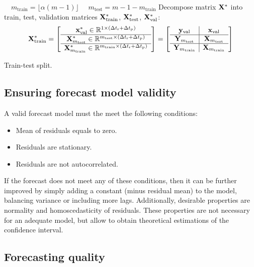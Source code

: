 \documentclass[12pt]{article}
\newcommand{\dtr}{\Delta t_\text{r}}
\newcommand{\dtp}{\Delta t_\text{p}}
\begin{document}
\begin{algorithm}[!h]
 $ \quad m_{\text{train}} = \lfloor\alpha(m-1)\rfloor$ \;
 $ \quad m_{\text{test}} = m - 1 - m_{\text{train}} $ \; %
 Decompose matrix ${\mathbf{X}}^{*}$ into train, test, validation matrices ${\mathbf{X}}^{*}_{\text{train}}$, ${\mathbf{X}}^{*}_{\text{test}}$, ${\mathbf{X}}^{*}_{\text{val}}$:
 \[\bX^{*}_{\text{train}} = \left[\begin{array}{c} \x^{*}_{\text{val}} \in \mathbb{R}^{1\times (\dtr + \dtp)}\\
 \hline
 \bX^{*}_{m_{\text{test}}} \in \mathbb{R}^{m_{\text{test}} \times (\dtr + \dtp)} \\
 \hline
 \bX^{*}_{m_{\text{train}}} \in \mathbb{R}^{m_{\text{train}} \times (\dtr + \dtp)} 
 \end{array}\right] = \left[\begin{array}{c|c} \y_{\text{val}} & \x_{\text{val}} \\
 \hline 
 \bY_{m_{\text{test}}} & \bX_{m_{\text{test}}}  \\
 \hline
 \bY_{m_{\text{train}}}  & \bX_{m_{\text{train}}}
 \end{array}\right]
 \]
 \caption{Train-test split.}\label{alg:train_test_rmse}
\end{algorithm}

\subsection{Ensuring forecast model validity}
A valid forecast model must the meet the following conditions:
\begin{itemize}
\item Mean of residuals equals to zero.
\item Residuals are stationary.
\item Residuals are not autocorrelated.
\end{itemize}
If the forecast does not meet any of these conditions, then it can be further improved by
 simply adding a constant (minus residual mean) to the model, balancing variance or including more lags. Additionally, desirable properties are normality and homoscedasticity of residuals. These properties are not necessary for an adequate model, but allow to obtain theoretical estimations of the confidence interval.

\subsection{Forecasting quality}
\end{document}
